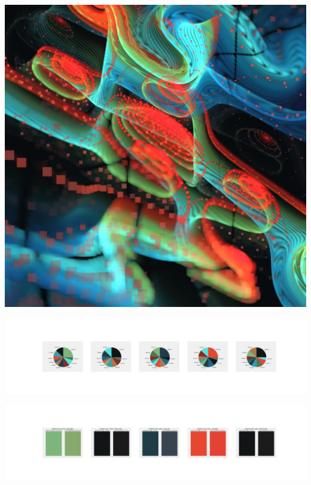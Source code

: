 \documentclass[11pt]{article}
\begin{document}
\begin{landscape}
    \begin{center}
    \includegraphics[width=\textwidth]{./nbimg/file (270).jpg}
    \end{center}

    \begin{center}
    \includegraphics[width=250mm]{./nbimg/pie-190.jpg}
    \end{center}

    \begin{center}
    \includegraphics[width=250mm]{./nbimg/peak-190.jpg}
    \end{center}
    


\end{landscape}
\end{document}

